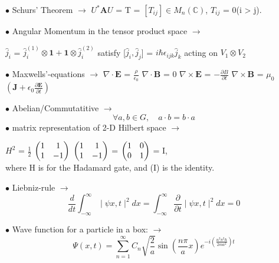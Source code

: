 \documentclass[a4paper, 10pt, onepage]{elegantbook}
\begin{document}
{$\bullet$ Schurs' Theorem $\longrightarrow$ $U^*{\mathbf A}U$ = T = $[T_{ij}] \in M_n(\mathbb C)$, $T_{ij}$ = 0(i > j). 

$\bullet$ Angular Momentum in the tensor product space $\longrightarrow$  

$\hat j_i$ = ${\hat j_i^{(1)}} \otimes \mathbf{1} + \mathbf{1} \otimes  {\hat j_i^{(2)}}$  satisfy [$\hat j_i, \hat 
j_j$] = ${i \hbar \epsilon_{ijk} {\hat j_k}}$ acting on $V_1 \otimes V_2$ 

$\bullet$ Maxwells'-equations $\longrightarrow$  
\noindent
$\nabla \cdot \mathbf E$ = $ \frac{\rho}{\epsilon_0}$ 
$\nabla \cdot \mathbf B$ = 0  
$\nabla \times \mathbf E$ = $ - \frac{\partial B}{\partial t}$ 
$\nabla \times \mathbf B$ = $\mu_0$  $\left( \mathbf {J} + \epsilon_0 \frac{\partial \mathbf E}{\partial t} \right)$  

$\bullet$ Abelian/Commutatitive $\longrightarrow$
\begin{equation} \label{eq:Abelian/Commutatitive}
\forall a,b \in G, \quad a \cdot b = b \cdot a
\end{equation}
$\bullet$ matrix representation of 2-D Hilbert space 
$\longrightarrow$  

$H^2$ = $\frac{1}{2}$ $\begin{pmatrix}1 & 1 \cr 1 & -1 \end{pmatrix}$ $\begin{pmatrix}1 & 1 \cr 1 & -1 \end{pmatrix}$ = 
$\begin{pmatrix}1 & 0 \cr 0 & 1 \end{pmatrix}$ = I,  \\

where H is for the Hadamard gate, and (I) is the identity.  

$\bullet$ Liebniz-rule $\longrightarrow$  
\begin{equation}
\frac{d}{dt} \int_{- \infty}^\infty \mid \psi{x,t} \mid^2 dx = \int_{- \infty}^\infty \frac{\partial}{\partial t} \mid 
\psi{x,t} \mid^2 dx = 0
\end{equation}

$\bullet$ Wave function for a particle in a box: $\longrightarrow$
\begin{equation}
\Psi(x,t) = \sum_{n=1}^\infty C_n \sqrt{\frac{2}{a}} \sin(\frac{n \pi}{a}x) e^{- i\left( \frac{n^2 \pi^2 \hbar}{2m 
{a}^2} \right)t}
\end{equation}

}
\end{document}
